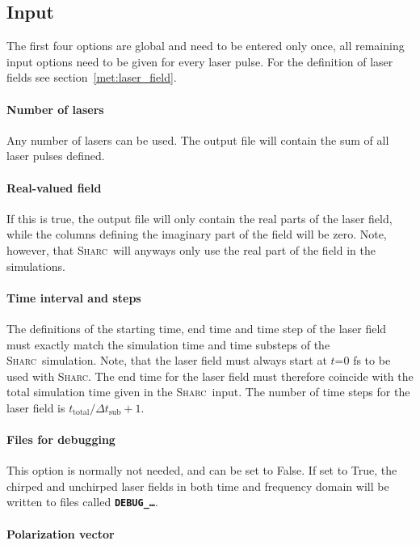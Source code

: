\documentclass[a4paper,11pt,DIV=15,openany,twoside=false]{scrbook}
\newcommand{\sharc}{\textsc{Sharc}}
\newcommand{\ttt}[1]{\textbf{\texttt{#1}}}
\begin{document}
\subsection{Input}

The first four options are global and need to be entered only once, all remaining input options need to be given for every laser pulse. For the definition of laser fields see section~\ref{met:laser_field}.

\paragraph{Number of lasers}

Any number of lasers can be used. The output file will contain the sum of all laser pulses defined.

\paragraph{Real-valued field}

If this is true, the output file will only contain the real parts of the laser field, while the columns defining the imaginary part of the field will be zero. Note, however, that \sharc\ will anyways only use the real part of the field in the simulations.

\paragraph{Time interval and steps}

The definitions of the starting time, end time and time step of the laser field must exactly match the simulation time and time substeps of the \sharc\ simulation. Note, that the laser field must always start at $t$=0 fs to be used with \sharc. The end time for the laser field must therefore coincide with the total simulation time given in the \sharc\ input. The number of time steps for the laser field is $t_\text{total}/\Delta t_\text{sub} +1$.

\paragraph{Files for debugging}

This option is normally not needed, and can be set to False. If set to True, the chirped and unchirped laser fields in both time and frequency domain will be written to files called \ttt{DEBUG\_\dots}.

\paragraph{Polarization vector}
\end{document}
